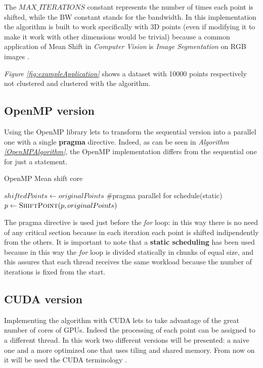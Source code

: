 \documentclass[10pt,twocolumn,letterpaper]{article}
\begin{document}
The $MAX\_ITERATIONS$ constant represents the number of times each point is shifted, while the BW constant stands for the bandwidth. In this implementation the algorithm is built to work specifically with 3D points (even if modifying it to make it work with other dimensions would be trivial) because a common application of Mean Shift in \emph{Computer Vision} is \emph{Image Segmentation} on RGB images \cite{comaniciu1999mean}.

\emph{Figure \ref{fig:exampleApplication}} shows a dataset with 10000 points respectively not clustered and clustered with the algorithm.


\subsection{OpenMP version}
Using the OpenMP library lets to transform the sequential version into a parallel one with a single \textbf{pragma} directive. Indeed, as can be seen in \emph{Algorithm \ref{OpenMPAlgorithm}}, the OpenMP implementation differs from the sequential one for just a statement.

\begin{algorithm}
\caption{OpenMP Mean shift core}
\label{OpenMPAlgorithm}
\begin{algorithmic}
	\State$shiftedPoints \gets originalPoints$
    			\State \#pragma parallel for schedule(static)
               \State $p\gets \Call{ShiftPoint}{p, originalPoints}$
            \EndFor
    \EndWhile
\EndFunction
\end{algorithmic}
\end{algorithm}

The pragma directive is used just before the \emph{for} loop: in this way there is no need of any critical section because in each iteration each point is shifted indipendently from the others. It is important to note that a \textbf{static scheduling} has been used because in this way the \emph{for} loop is divided statically in chunks of equal size, and this assures that each thread receives the same workload because the number of iterations is fixed from the start.


\subsection{CUDA version}
Implementing the algorithm with CUDA lets to take advantage of the great number of cores of GPUs. Indeed the processing of each point can be assigned to a different thread. In this work two different versions will be presented: a naive one and a more optimized one that uses tiling and shared memory. From now on it will be used the CUDA terminology \cite{CUDADocs}.
\end{document}
